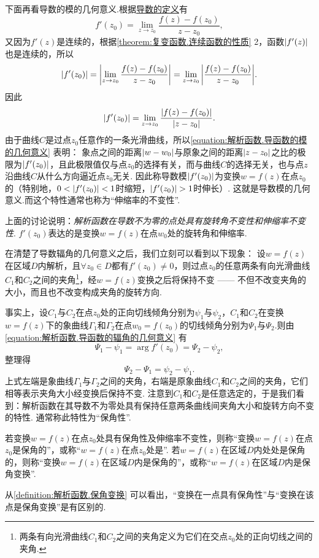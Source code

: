 下面再看导数的模的几何意义.根据\hyperref[equation:解析函数.导数的定义式]{导数的定义}有\[
f'(z_0) = \lim\limits_{z \to z_0} \frac{f(z) - f(z_0)}{z - z_0},
\]又因为\(f'(z)\)是连续的，根据\cref{theorem:复变函数.连续函数的性质}  2，函数\(\abs{f'(z)}\)也是连续的，所以\[
\abs{f'(z_0)}
= \abs{ \lim\limits_{z \to z_0} \frac{f(z) - f(z_0)}{z - z_0} }
= \lim\limits_{z \to z_0} \abs{ \frac{f(z) - f(z_0)}{z - z_0} }.
\]因此\begin{equation}\label{equation:解析函数.导函数的模的几何意义}
\abs{f'(z_0)}
= \lim\limits_{z \to z_0} \frac{\abs{f(z) - f(z_0)}}{\abs{z - z_0}}.
\end{equation}
由于曲线\(C\)是过点\(z_0\)任意作的一条光滑曲线，所以\cref{equation:解析函数.导函数的模的几何意义} 表明：
象点之间的距离\(\abs{w - w_0}\)与原象之间的距离\(\abs{z - z_0}\)之比的极限为\(\abs{f'(z_0)}\)，且此极限值仅与点\(z_0\)的选择有关，而与曲线\(C\)的选择无关，也与点\(z\)沿曲线\(C\)从什么方向逼近点\(z_0\)无关.
因此称导数模\(\abs{f'(z_0)}\)为变换\(w = f(z)\)在点\(z_0\)的（特别地，\(0 < \abs{f'(z_0)} < 1\)时缩短，\(\abs{f'(z_0)} > 1\)时伸长）.
这就是导数模的几何意义.而这个特性通常也称为“伸缩率的不变性”.

上面的讨论说明：\emph{解析函数在导数不为零的点处具有旋转角不变性和伸缩率不变性}.
\(f'(z_0)\)表达的是变换\(w = f(z)\)在点\(w_0\)处的旋转角和伸缩率.

在清楚了导数辐角的几何意义之后，我们立刻可以看到以下现象：
设\(w = f(z)\)在区域\(D\)内解析，且\(\forall z_0 \in D\)都有\(f'(z_0) \neq 0\)，则过点\(z_0\)的任意两条有向光滑曲线\(C_1\)和\(C_2\)之间的夹角\footnote{两条有向光滑曲线\(C_1\)和\(C_2\)之间的夹角定义为它们在交点\(z_0\)处的正向切线之间的夹角.}，经\(w = f(z)\)变换之后将保持不变 —— 不但不改变夹角的大小，而且也不改变构成夹角的旋转方向.

事实上，设\(C_1\)与\(C_2\)在点\(z_0\)处的正向切线倾角分别为\(\psi_1\)与\(\psi_2\)，\(C_1\)和\(C_2\)在变换\(w = f(z)\)下的象曲线\(\Gamma_1\)和\(\Gamma_2\)在点\(w_0 = f(z_0)\)的切线倾角分别为\(\Psi_1\)与\(\Psi_2\).则由\cref{equation:解析函数.导函数的辐角的几何意义} 有\[
\Psi_1 - \psi_1 = \arg f'(z_0) = \Psi_2 - \psi_2,
\]整理得\[
\Psi_2 - \Psi_1 = \psi_2 - \psi_1.
\]上式左端是象曲线\(\Gamma_1\)与\(\Gamma_2\)之间的夹角，右端是原象曲线\(C_1\)和\(C_2\)之间的夹角，它们相等表示夹角大小经变换后保持不变.
注意到\(C_1\)和\(C_2\)是任意选定的，于是我们看到：解析函数在其导数不为零处具有保持任意两条曲线间夹角大小和旋转方向不变的特性.
通常称此特性为“保角性”.

\begin{definition}\label{definition:解析函数.保角变换}
若变换\(w = f(z)\)在点\(z_0\)处具有保角性及伸缩率不变性，则称“变换\(w = f(z)\)在点\(z_0\)是保角的”，或称“\(w = f(z)\)在点\(z_0\)处是”.
若\(w = f(z)\)在区域\(D\)内处处是保角的，则称“变换\(w = f(z)\)在区域\(D\)内是保角的”，或称“\(w = f(z)\)在区域\(D\)内是保角变换”.
\end{definition}
从\cref{definition:解析函数.保角变换} 可以看出，“变换在一点具有保角性”与“变换在该点是保角变换”是有区别的.


